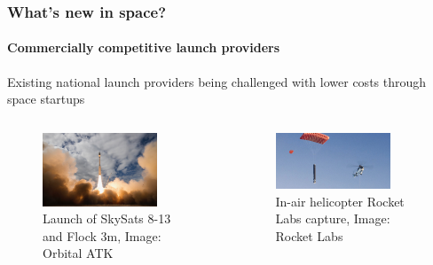 \documentclass{beamer}
\begin{document}
\begin{frame}
  \frametitle{What's new in space?}
  \framesubtitle{Commercially competitive launch providers}
  Existing national launch providers being challenged with lower costs through space startups
  
  \begin{columns}[t]

    \begin{column}{5cm}
      \begin{figure}
        \includegraphics[width=0.8\textwidth]{images/planetlabs_launch.jpg}
        \caption{Launch of SkySats 8-13 and Flock 3m, Image: Orbital ATK}
        \label{fig:space_segment}
      \end{figure}
    \end{column}

    \begin{column}{5cm}
      \begin{figure}
        \includegraphics[width=0.8\textwidth]{images/rocket_lab_capture.jpeg}
        \caption{In-air helicopter Rocket Labs capture, Image: Rocket Labs}
        \label{fig:space_segment}
      \end{figure}
    \end{column}

  \end{columns}
\end{frame}
\end{document}
